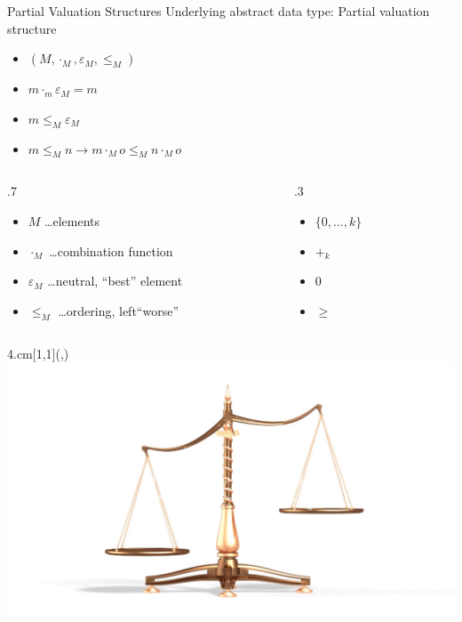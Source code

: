 \begin{frame}{Partial Valuation Structures}
Underlying \alert{abstract data type}:
Partial valuation structure %
\begin{itemize}
\item $(M, \cdot_M, \varepsilon_M, \leq_M)$ 
\item $m \cdot_m \varepsilon_M = m$
\item $m \leq_M \varepsilon_M$
\item $m \leq_M n \rightarrow m \cdot_M o \leq_M n \cdot_M o$
\end{itemize}

\vspace*{2ex}

\begin{columns}[onlytextwidth,T]
    
    \begin{column}{.7\textwidth}
          
    
    \begin{itemize}
    \item $M$ \ldots elements
    \item $\cdot_M$ \ldots combination function
    \item $\varepsilon_M$ \ldots neutral, ``best'' element
    \item $\leq_M$ \ldots ordering, left``worse''
    \end{itemize}
    \end{column}
    
    \begin{column}{.3\textwidth}
  	 \begin{itemize}
    \item $\{0, \ldots, k \}$ 
    \item $+_k$
    \item $0$ 
    \item $\geq$
    \end{itemize}
    \end{column}
  \end{columns}

  \vspace*{2ex}
  
\begin{textblock*}{4.cm}[1,1](\textwidth-0.5cm,\textheight-4.63cm)
\includegraphics[width=\textwidth]{img/scales.jpg}
\end{textblock*}
  \hfill \emph{\cite{Gadducci2013,SchiendorferPvs2015}}
\end{frame}
